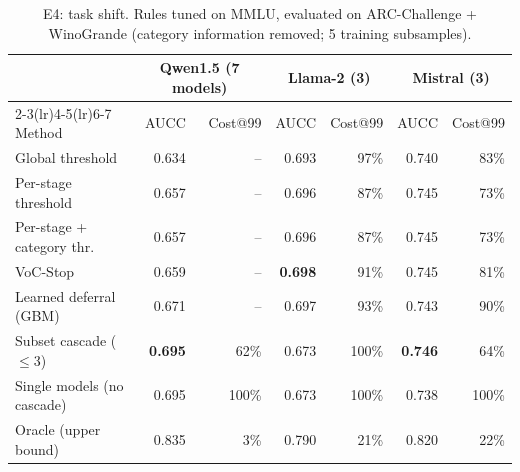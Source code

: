 \begin{table}[t]\centering\small
\caption{E4: task shift. Rules tuned on MMLU, evaluated on ARC-Challenge + WinoGrande (category information removed; 5 training subsamples).}\label{tab:shift}
\begin{tabular}{lrrrrrr}\toprule
 & \multicolumn{2}{c}{Qwen1.5 (7 models)} & \multicolumn{2}{c}{Llama-2 (3)} & \multicolumn{2}{c}{Mistral (3)}\\
\cmidrule(lr){2-3}\cmidrule(lr){4-5}\cmidrule(lr){6-7}
Method & AUCC & Cost@99 & AUCC & Cost@99 & AUCC & Cost@99\\\midrule
Global threshold & 0.634 & -- & 0.693 & 97\% & 0.740 & 83\%\\
Per-stage threshold & 0.657 & -- & 0.696 & 87\% & 0.745 & 73\%\\
Per-stage + category thr. & 0.657 & -- & 0.696 & 87\% & 0.745 & 73\%\\
VoC-Stop & 0.659 & -- & \textbf{0.698} & 91\% & 0.745 & 81\%\\
Learned deferral (GBM) & 0.671 & -- & 0.697 & 93\% & 0.743 & 90\%\\
Subset cascade ($\le$3) & \textbf{0.695} & 62\% & 0.673 & 100\% & \textbf{0.746} & 64\%\\
Single models (no cascade) & 0.695 & 100\% & 0.673 & 100\% & 0.738 & 100\%\\
\midrule
Oracle (upper bound) & 0.835 & 3\% & 0.790 & 21\% & 0.820 & 22\%\\
\bottomrule\end{tabular}
\end{table}
